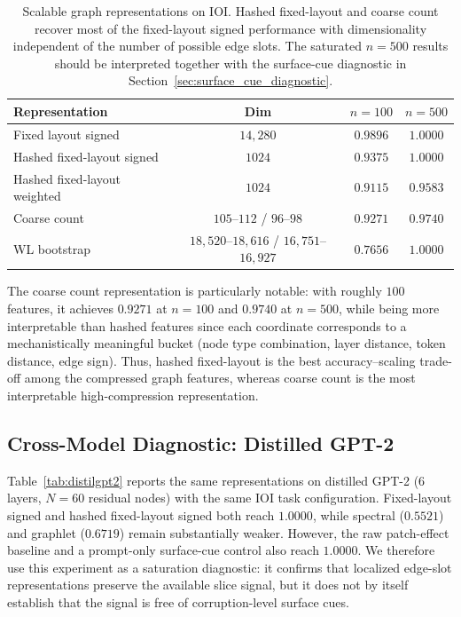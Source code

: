 \documentclass[11pt,a4paper]{article}
\begin{document}
\begin{table}[H]
\centering
\small
\begin{tabular}{lccc}
\toprule
\textbf{Representation} & \textbf{Dim} & \textbf{$n\!=\!100$} & \textbf{$n\!=\!500$} \\
\midrule
Fixed layout signed & $14,\!280$ & $0.9896$ & $1.0000$ \\
Hashed fixed-layout signed & $1024$ & $0.9375$ & $1.0000$ \\
Hashed fixed-layout weighted & $1024$ & $0.9115$ & $0.9583$ \\
Coarse count & $105$--$112$ / $96$--$98$ & $0.9271$ & $0.9740$ \\
WL bootstrap & $18,\!520$--$18,\!616$ / $16,\!751$--$16,\!927$ & $0.7656$ & $1.0000$ \\
\bottomrule
\end{tabular}
\caption{Scalable graph representations on IOI. Hashed fixed-layout and coarse count recover most of the fixed-layout signed performance with dimensionality independent of the number of possible edge slots. The saturated $n=500$ results should be interpreted together with the surface-cue diagnostic in Section~\ref{sec:surface_cue_diagnostic}.}
\label{tab:scalable}
\end{table}

The coarse count representation is particularly notable: with roughly $100$ features, it achieves $0.9271$ at $n=100$ and $0.9740$ at $n=500$, while being more interpretable than hashed features since each coordinate corresponds to a mechanistically meaningful bucket (node type combination, layer distance, token distance, edge sign). Thus, hashed fixed-layout is the best accuracy--scaling trade-off among the compressed graph features, whereas coarse count is the most interpretable high-compression representation.

\subsection{Cross-Model Diagnostic: Distilled GPT-2}

Table~\ref{tab:distilgpt2} reports the same representations on distilled GPT-2 (6 layers, $N=60$ residual nodes) with the same IOI task configuration. Fixed-layout signed and hashed fixed-layout signed both reach $1.0000$, while spectral ($0.5521$) and graphlet ($0.6719$) remain substantially weaker. However, the raw patch-effect baseline and a prompt-only surface-cue control also reach $1.0000$. We therefore use this experiment as a saturation diagnostic: it confirms that localized edge-slot representations preserve the available slice signal, but it does not by itself establish that the signal is free of corruption-level surface cues.
\end{document}
